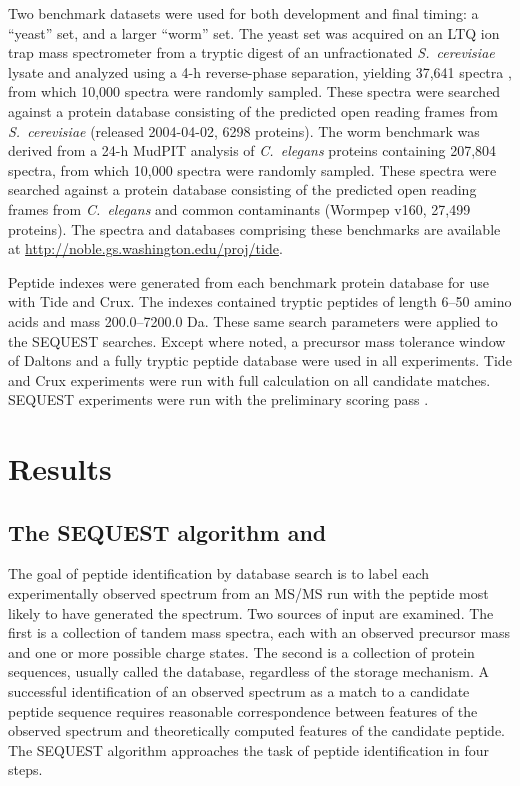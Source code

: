 Two benchmark datasets were used for both development and final
timing: a ``yeast'' set, and a larger ``worm'' set. The yeast set was
acquired on an LTQ ion trap mass spectrometer from a tryptic digest of
an unfractionated {\it S.\ cerevisiae} lysate and analyzed using a 4-h
reverse-phase separation, yielding 37,641 spectra
\cite{kall:semi-supervised}, from which 10,000 spectra were randomly
sampled. These spectra were searched against a protein database
consisting of the predicted open reading frames from {\it
  S.\ cerevisiae} (released 2004-04-02, 6298 proteins). The worm
benchmark was derived from a 24-h MudPIT analysis of {\it C.\ elegans}
proteins containing 207,804 spectra, from which 10,000 spectra were
randomly sampled.  These spectra were searched against a protein
database consisting of the predicted open reading frames from {\it
  C.\ elegans} and common contaminants (Wormpep v160, 27,499
proteins).  The spectra and databases comprising these benchmarks are
available at \url{http://noble.gs.washington.edu/proj/tide}.

Peptide indexes were generated from each benchmark protein database
for use with Tide and Crux. The indexes contained tryptic peptides of
length 6--50 amino acids and mass 200.0--7200.0 Da. These same search
parameters were applied to the SEQUEST searches. Except where noted, a
precursor mass tolerance window of \DIFdelbegin {}\DIFdelend \DIFaddbegin {}\DIFaddend Daltons and a fully
tryptic peptide database were used in all experiments. Tide and Crux
experiments were run with full \XCorr calculation on all candidate
matches. SEQUEST experiments were run with the preliminary scoring
pass \Sp.


\section{Results}

\subsection{The SEQUEST algorithm and \XCorr}

The goal of peptide identification by database search is to label each
experimentally observed spectrum from an MS/MS run with the peptide
most likely to have generated the spectrum. Two sources of input are
examined. The first is a collection of tandem mass spectra, each
with an observed precursor mass and one or more possible charge
states. The second is a collection of protein sequences, usually
called the database, regardless of the storage mechanism.  A
successful identification of an observed spectrum as a match to a
candidate peptide sequence requires reasonable correspondence between
features of the observed spectrum and theoretically computed features
of the candidate peptide. The SEQUEST algorithm approaches the task of
peptide identification in four steps.

